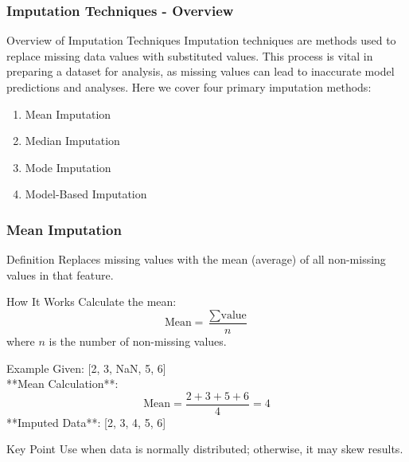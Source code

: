 \documentclass[aspectratio=169]{beamer}
\begin{document}
\begin{frame}[fragile]
    \frametitle{Imputation Techniques - Overview}
    \begin{block}{Overview of Imputation Techniques}
        Imputation techniques are methods used to replace missing data values with substituted values. This process is vital in preparing a dataset for analysis, as missing values can lead to inaccurate model predictions and analyses. Here we cover four primary imputation methods:
    \end{block}
    \begin{enumerate}
        \item Mean Imputation
        \item Median Imputation
        \item Mode Imputation
        \item Model-Based Imputation
    \end{enumerate}
\end{frame}

\begin{frame}[fragile]
    \frametitle{Mean Imputation}
    \begin{block}{Definition}
        Replaces missing values with the mean (average) of all non-missing values in that feature.
    \end{block}
    
    \begin{block}{How It Works}
        Calculate the mean:
        \begin{equation}
            \text{Mean} = \frac{\sum{\text{value}}}{n}
        \end{equation}
        where \( n \) is the number of non-missing values.
    \end{block}
    
    \begin{block}{Example}
        Given: [2, 3, NaN, 5, 6] \\
        **Mean Calculation**: 
        \begin{equation}
            \text{Mean} = \frac{2 + 3 + 5 + 6}{4} = 4
        \end{equation}
        **Imputed Data**: [2, 3, 4, 5, 6]
    \end{block}

    \begin{block}{Key Point}
        Use when data is normally distributed; otherwise, it may skew results.
    \end{block}
\end{frame}
\end{document}
